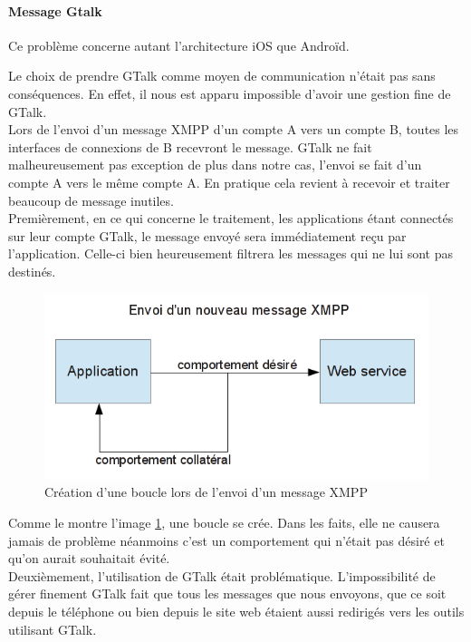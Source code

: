 \paragraph{Message Gtalk}

Ce problème concerne autant l'architecture iOS que Androïd. 

Le choix de prendre GTalk comme moyen de communication n'était pas sans conséquences. En effet, il nous
est apparu impossible d'avoir une gestion fine de GTalk.
\\


Lors de l'envoi d'un message XMPP d'un compte A vers un compte B, toutes les interfaces de connexions
de B recevront le message. GTalk ne fait malheureusement pas exception de plus dans notre cas, l'envoi
se fait d'un compte A vers le même compte A. En pratique cela revient à recevoir et traiter beaucoup de
message inutiles.
\\


Premièrement, en ce qui concerne le traitement, les applications étant connectés sur leur compte GTalk, 
le message envoyé sera immédiatement reçu par l'application. Celle-ci bien heureusement filtrera les 
messages qui ne lui sont pas destinés. 

\begin{figure}[!h]
	\center
	\includegraphics[width=12cm]{img/boucle-envoi-xmpp.png}
	\caption{Création d'une boucle lors de l'envoi d'un message XMPP}
	\label{boucle-envoi-xmpp}
\end{figure}

Comme le montre l'image \ref{boucle-envoi-xmpp}, une boucle se crée. Dans les faits, elle ne causera jamais de problème 
néanmoins c'est un comportement qui n'était pas désiré et qu'on aurait souhaitait évité.
\\


Deuxièmement, l'utilisation de GTalk était problématique. L'impossibilité de gérer finement GTalk fait que
tous les messages que nous envoyons, que ce soit depuis le téléphone ou bien depuis le site web étaient
aussi redirigés vers les outils utilisant GTalk.

